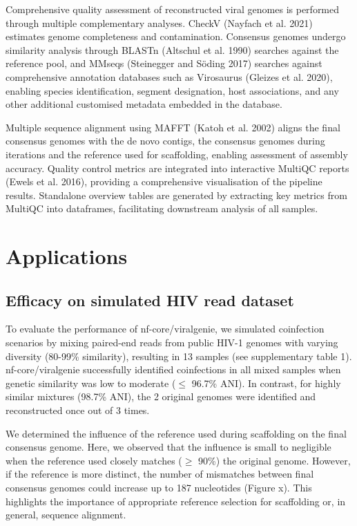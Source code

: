 Comprehensive quality assessment of reconstructed viral genomes is performed through multiple complementary analyses. CheckV (Nayfach et al. 2021) estimates genome completeness and contamination. Consensus genomes undergo similarity analysis through BLASTn (Altschul et al. 1990) searches against the reference pool, and MMseqs (Steinegger and Söding 2017) searches against comprehensive annotation databases such as Virosaurus (Gleizes et al. 2020), enabling species identification, segment designation, host associations, and any other additional customised metadata embedded in the database.

Multiple sequence alignment using MAFFT (Katoh et al. 2002) aligns the final consensus genomes with the de novo contigs, the consensus genomes during iterations and the reference used for scaffolding, enabling assessment of assembly accuracy. Quality control metrics are integrated into interactive MultiQC reports (Ewels et al. 2016), providing a comprehensive visualisation of the pipeline results. Standalone overview tables are generated by extracting key metrics from MultiQC into dataframes, facilitating downstream analysis of all samples.

\section{Applications}

\subsection{Efficacy on simulated HIV read dataset}

To evaluate the performance of nf-core/viralgenie, we simulated coinfection scenarios by mixing paired-end reads from public HIV-1 genomes with varying diversity (80-99\% similarity), resulting in 13 samples (see supplementary table 1). nf-core/viralgenie successfully identified coinfections in all mixed samples when genetic similarity was low to moderate ($\leq$ 96.7\% ANI). In contrast, for highly similar mixtures (98.7\% ANI), the 2 original genomes were identified and reconstructed once out of 3 times.

We determined the influence of the reference used during scaffolding on the final consensus genome. Here, we observed that the influence is small to negligible when the reference used closely matches ($\geq$ 90\%) the original genome. However, if the reference is more distinct, the number of mismatches between final consensus genomes could increase up to 187 nucleotides (Figure x). This highlights the importance of appropriate reference selection for scaffolding or, in general, sequence alignment.

